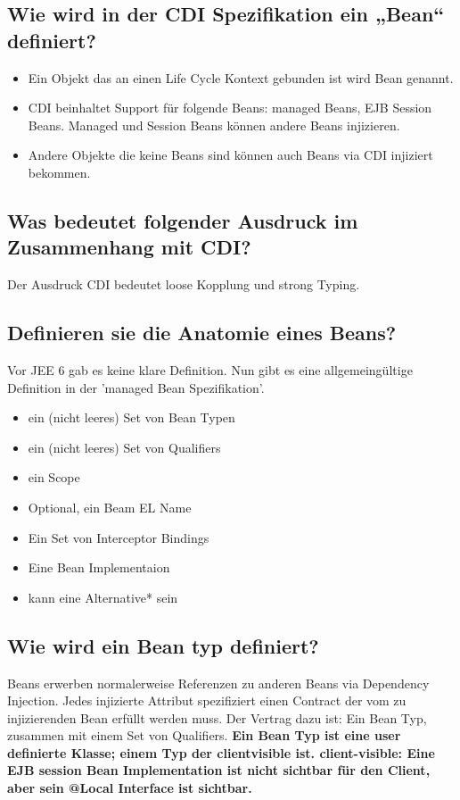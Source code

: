 \subsection{Wie wird in der CDI Spezifikation ein „Bean“ definiert?}
\begin{itemize}
	\item Ein Objekt das an einen Life Cycle Kontext gebunden ist wird Bean genannt.
	\item CDI beinhaltet Support für folgende Beans: managed Beans, EJB Session Beans. Managed und Session Beans können andere Beans injizieren.
	\item Andere Objekte die keine Beans sind können auch Beans via CDI	injiziert bekommen. 
\end{itemize}

\subsection{Was bedeutet folgender Ausdruck im Zusammenhang mit CDI?}
Der Ausdruck CDI bedeutet loose Kopplung und strong Typing.

\subsection{Definieren sie die Anatomie eines Beans?}
Vor JEE 6 gab es keine klare Definition. Nun gibt es eine allgemeingültige Definition in der 'managed Bean Spezifikation'.
\begin{itemize}
	\item ein (nicht leeres) Set von Bean Typen
	\item ein (nicht leeres) Set von Qualifiers
	\item ein Scope
	\item Optional, ein Beam EL Name
	\item Ein Set von Interceptor Bindings
	\item Eine Bean Implementaion
	\item kann eine Alternative* sein 
\end{itemize}

\subsection{Wie wird ein Bean typ definiert?}
Beans erwerben normalerweise Referenzen zu anderen Beans via Dependency Injection. Jedes injizierte Attribut spezifiziert einen Contract der vom zu injizierenden Bean erfüllt werden muss. Der Vertrag dazu ist: Ein Bean Typ, zusammen mit einem Set von Qualifiers. \textbf{Ein Bean Typ ist eine user definierte Klasse; einem Typ der clientvisible ist. client-visible: Eine EJB session Bean Implementation ist nicht sichtbar für den Client, aber sein @Local Interface ist sichtbar.}

